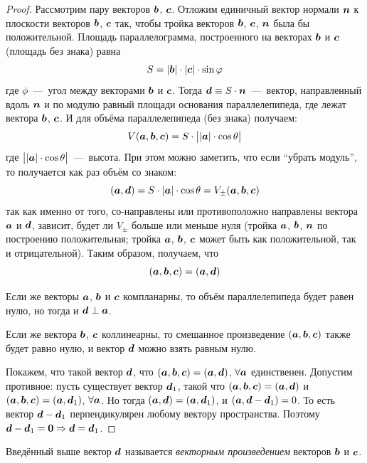 \documentclass[a4paper,12pt]{article}
\begin{document}
\begin{proof}
    Рассмотрим пару векторов $\boldsymbol b$, $\boldsymbol c$.
    Отложим единичный вектор нормали $\boldsymbol n$ к плоскости векторов $\boldsymbol b$, $\boldsymbol c$ так, чтобы тройка векторов $\boldsymbol b$, $\boldsymbol c$, $\boldsymbol n$ была бы положительной.
    Площадь параллелограмма, построенного на векторах $\boldsymbol b$ и $\boldsymbol c$ (площадь без знака) равна
    \[
      S = |\boldsymbol b| \cdot |\boldsymbol c| \cdot \sin\varphi
    \]
    где $\phi$~---~угол между векторами $\boldsymbol b$ и $\boldsymbol c$.
    Тогда $\bds d \hm\equiv S \hm\cdot \bds n$~---~вектор, направленный вдоль $\boldsymbol n$ и по модулю равный площади основания параллелепипеда, где лежат вектора $\boldsymbol b$, $\boldsymbol c$.
    И для объёма параллелепипеда (без знака) получаем:
    \[
      V(\boldsymbol a, \boldsymbol b, \boldsymbol c) = S \cdot \bigl||\boldsymbol a| \cdot \cos\theta\bigr|
    \]
    где $\bigl||\boldsymbol a| \cdot \cos\theta\bigr|$~---~высота.
    При этом можно заметить, что если ``убрать модуль'', то получается как раз объём со знаком:
    \[
      (\boldsymbol a, \boldsymbol d) = S \cdot |\boldsymbol a| \cdot \cos\theta = V_{\pm}(\boldsymbol a, \boldsymbol b, \boldsymbol c)
    \]
    так как именно от того, со-направлены или противоположно направлены вектора $\boldsymbol a$ и $\boldsymbol d$, зависит, будет ли $V_{\pm}$ больше или меньше нуля (тройка $\boldsymbol a$, $\boldsymbol b$, $\boldsymbol n$ по построению положительная; тройка $\boldsymbol a$, $\boldsymbol b$, $\boldsymbol c$ может быть как положительной, так и отрицательной).
    Таким образом, получаем, что
    \[
      (\boldsymbol a, \boldsymbol b, \boldsymbol c) = (\boldsymbol a, \boldsymbol d)
    \]
    
    Если же векторы $\boldsymbol a$, $\boldsymbol b$ и $\boldsymbol c$ компланарны, то объём параллелепипеда будет равен нулю, но тогда и $\bds d \hm\perp \bds a$.
    
    Если же вектора $\boldsymbol b$, $\boldsymbol c$ коллинеарны, то смешанное произведение $(\boldsymbol a, \boldsymbol b, \boldsymbol c)$ также будет равно нулю, и вектор $\boldsymbol d$ можно взять равным нулю.
    
    Покажем, что такой вектор $\boldsymbol d$, что $(\bds a, \bds b, \bds c) \hm= (\bds a, \bds d)$, $\forall \boldsymbol a$ единственен.
    Допустим противное: пусть существует вектор $\boldsymbol d_1$, такой что $(\bds a, \bds b, \bds c) \hm= (\bds a, \bds d)$ и $(\bds a, \bds b, \bds c) \hm= (\bds a, \bds d_1)$, $\forall \boldsymbol a$.
    Но тогда $(\bds a, \bds d) \hm= (\bds a, \bds d_1)$, и $(\bds a, \bds d \hm- \bds d_1) \hm= 0$.
    То есть вектор $\bds d \hm- \bds d_1$ перпендикулярен любому вектору пространства.
    Поэтому $\bds d \hm- \bds d_1 \hm= \bds 0 \hm\Rightarrow \bds d \hm= \bds d_1$.
  \end{proof}
  
  Введённый выше вектор $\boldsymbol d$ называется \emph{векторным произведением} векторов $\boldsymbol b$ и $\boldsymbol c$.
  
\end{document}
